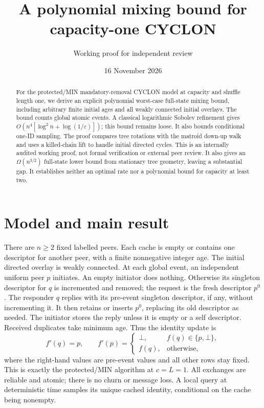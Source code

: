 \documentclass[11pt]{article}
\title{A polynomial mixing bound for capacity-one CYCLON}
\author{Working proof for independent review}
\date{16 November 2026}
\begin{document}
\maketitle
\begin{abstract}
For the protected/MIN mandatory-removal CYCLON model at capacity and
shuffle length one, we derive an explicit polynomial worst-case
full-state mixing bound, including arbitrary finite initial ages and
all weakly connected initial overlays. The bound counts global atomic
events. A classical logarithmic Sobolev refinement gives
$O(n^4[\log^2 n+\log(1/\varepsilon)])$; this bound remains loose.
It also bounds conditional one-ID sampling. The proof compares tree
rotations with the matroid down-up walk and uses a killed-chain lift
to handle initial directed cycles. This is an internally audited
working proof, not formal verification or external peer review. It
also gives an $\Omega(n^{3/2})$ full-state lower bound from stationary
tree geometry, leaving a substantial gap. It establishes neither an
optimal rate nor a polynomial bound for capacity at least two.
\end{abstract}

\section{Model and main result}
There are $n\ge2$ fixed labelled peers. Each cache is empty or contains
one descriptor for another peer, with a finite nonnegative integer age.
The initial directed overlay is weakly connected. At each global event,
an independent uniform peer $p$ initiates. An empty initiator does nothing.
Otherwise its singleton descriptor for $q$ is incremented and removed;
the request is the fresh descriptor $p^0$. The responder $q$ replies
with its pre-event singleton descriptor, if any, without incrementing it.
It then retains or inserts $p^0$, replacing its old descriptor as needed.
The initiator stores the reply unless it is empty or a self descriptor.
Received duplicates take minimum age. Thus the identity update is
\[
 f'(q)=p,\qquad f'(p)=
 \begin{cases}\bot,& f(q)\in\{p,\bot\},\\f(q),&\text{otherwise},\end{cases}
\]
where the right-hand values are pre-event values and all other rows stay
fixed. This is exactly the protected/MIN algorithm at $c=L=1$.
All exchanges are reliable and atomic; there is no churn or message loss.
A local query at deterministic time samples its unique cached identity,
conditional on the cache being nonempty.
\end{document}

